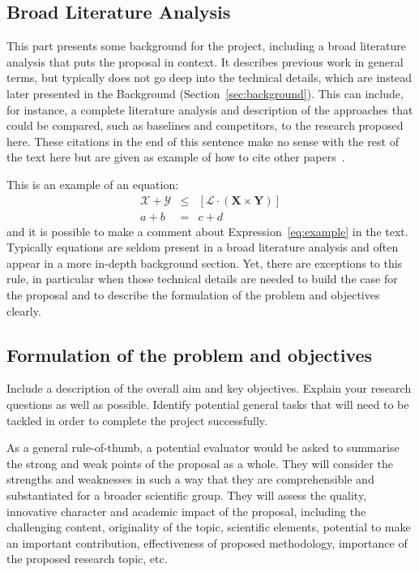 \documentclass{article}
\newcommand{\cX}{\mathcal{X}}
\newcommand{\cL}{\mathcal{L}}
\newcommand{\cY}{\mathcal{Y}}
\newcommand{\bX}{\mathbf{X}}
\newcommand{\bY}{\mathbf{Y}}
\begin{document}
\subsection{Broad Literature Analysis}\label{sec:broadliterature}

This part presents some background for the project, including a broad literature analysis that puts the proposal in context. It describes previous work in general terms, but typically does not go deep into the technical details, which are instead later presented in the Background (Section~\ref{sec:background}). This can include, for instance, a complete literature analysis and description of the approaches that could be compared, such as baselines and competitors, to the research proposed here. These citations in the end of this sentence make no sense with the rest of the text here but are given as example of how to cite other papers~\citep{al2019predicting,alotaibi2020applications}.

This is an example of an equation:
\begin{eqnarray}
    \label{eq:example}
    \cX + \cY & \leq & \left[ \cL \cdot (\bX \times \bY) \right]\\
    a + b & = & c + d \nonumber
\end{eqnarray}
\noindent
and it is possible to make a comment about Expression~\eqref{eq:example} in the text. Typically equations are seldom present in a broad literature analysis and often appear in a more in-depth background section. Yet, there are exceptions to this rule, in particular when those technical details are needed to build the case for the proposal and to describe the formulation of the problem and objectives clearly.

\subsection{Formulation of the problem and objectives}

Include a description of the overall aim and key objectives. Explain your research questions as well as possible. Identify potential general tasks that will need to be tackled in order to complete the project successfully.

As a general rule-of-thumb, a potential evaluator would be asked to summarise the strong and weak points of the proposal as a whole. They will consider the strengths and weaknesses in such a way that they are comprehensible and substantiated for a broader scientific group. They will assess the quality, innovative character and academic impact of the proposal, including the challenging content, originality of the topic, scientific elements, potential to make an important contribution, effectiveness of proposed methodology, importance of the proposed research topic, etc.
\end{document}
